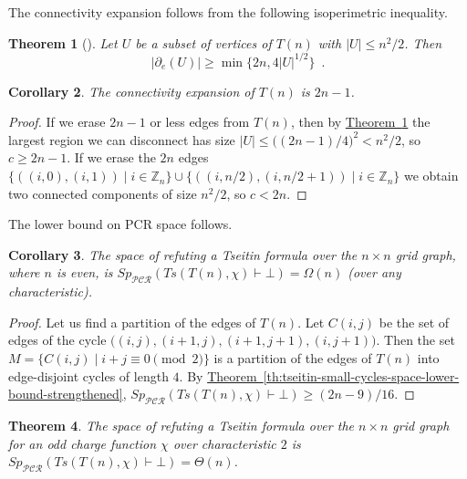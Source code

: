 \documentclass[11pt]{article}
\numberwithin{equation}{section}
\newtheorem{theorem}{Theorem}[section]
\newtheorem{corollary}[theorem]{Corollary}
\theoremstyle{definition}
\theoremstyle{plain}
\newcommand{\expref}[2]{\hyperref[#2]{#1~\ref{#2}}}
\theoremstyle{plain}
\theoremstyle{definition}
\newcommand{\refth}[1]{\expref{Theorem}{#1}}
\newcommand{\bigtheta}[1]{\Theta ( #1 )}
\newcommand{\bigomega}[1]{\Omega ( #1 )}
\newcommand{\minofexpr}[2][]{\min_{#1} \{ #2 \}}
\newcommand{\set}[1]{\{ #1 \}}
\newcommand{\setdescr}[3][\mid]{\set{ #2 #1 #3 }}
\newcommand{\setsize}[1]{\lvert#1\rvert}
\newcommand{\union}{\cup}
\newcommand{\eqperiod}{\enspace .}
\newcommand{\proofsystemsubindexformat}[1]{\scriptscriptstyle{\mathcal{#1}}}
\newcommand{\pcrnot}{\proofsystemsubindexformat{PCR}}
\newcommand{\derivabbrevsmall}[2]{( #1 \vdash #2 )}
\newcommand{\refutabbrevsmall}[1]{\derivabbrevsmall{#1}{\!\bot}}
\newcommand{\genericrefsmall}[3]{{\mathit{#1}}_{#2}\refutabbrevsmall{#3}}
\newcommand{\mspaceref}[2][]{\genericrefsmall{Sp}{#1}{#2}}
\newcommand{\formulaformat}[1]{\mathit{#1}}
\newcommand{\tseitinnot}[2]{\formulaformat{Ts}({#1,#2})}
\newcommand{\ntuple}[1]{\bigl( #1 \bigr)}
\newcommand{\connectivityexpansionnot}{c}
\newcommand{\tseitincharge}{\chi}
\begin{document}
The connectivity expansion follows from the following isoperimetric inequality.
\begin{theorem}[\cite{BL91IsoperimetricGrid}]
  \label{th:isoperimetric-grid}
  Let $U$ be a subset of vertices of $T(n)$ with $\setsize{U}\leq n^2/2$. Then
  \begin{equation*}
    \setsize{\partial_e(U)}\geq\minofexpr{2n,4\setsize{U}^{1/2}} \eqperiod
  \end{equation*}
\end{theorem}
\begin{corollary}
  The connectivity expansion of $T(n)$ is $2n-1$.
\end{corollary}
\begin{proof}
  If we erase $2n-1$ or less edges from $T(n)$, then by \refth{th:isoperimetric-grid} the largest region we can disconnect has size $\setsize{U}\leq\bigl((2n-1)/4\bigr)^2<n^2/2$, so $\connectivityexpansionnot\geq 2n-1$. If we erase the $2n$ edges $\setdescr{((i, 0), (i, 1))}{i \in \mathbb{Z}_n} \union \setdescr{((i, n / 2), (i, n / 2 + 1))}{i \in \mathbb{Z}_n}$ we obtain two connected components of size $n^2/2$, so $\connectivityexpansionnot<2n$.
\end{proof}

The lower bound on PCR space follows.
\begin{corollary}
  \label{cor:grid-space-lower-bound}
  The space of refuting a Tseitin formula over the $n\times n$ grid
  graph, where $n$ is even, is
  $\mspaceref[\pcrnot]{\tseitinnot{T(n)}{\tseitincharge}}=\bigomega{n}$
  (over any characteristic).
\end{corollary}
\begin{proof}
  Let us find a partition of the edges of $T(n)$. Let $C(i,j)$ be the set of edges of the cycle $\ntuple{(i,j),(i+1,j),(i+1,j+1),(i,j+1)}$. Then the set $M=\setdescr{C(i,j)}{i+j \equiv 0 \pmod{2}}$ is a partition of the edges of $T(n)$ into edge-disjoint cycles of length $4$. By \refth{th:tseitin-small-cycles-space-lower-bound-strengthened}, $\mspaceref[\pcrnot]{\tseitinnot{T(n)}{\tseitincharge}}\geq (2n-9)/16$.
\end{proof}

\begin{theorem} \label{th:grid-space-tight-bound}
  The space of refuting a Tseitin formula over the $n\times n$ grid graph for an odd charge function $\tseitincharge$ over characteristic $2$ is $\mspaceref[\pcrnot]{\tseitinnot{T(n)}{\tseitincharge}}=\bigtheta{n}$.
\end{theorem}
\end{document}
